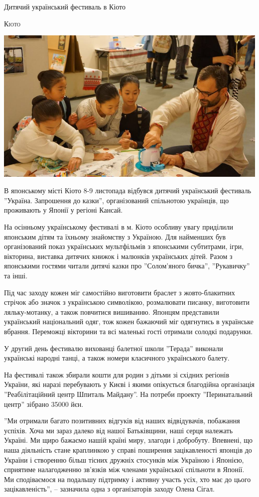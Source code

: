 \documentclass[10pt,a4paper]{article}
\newcommand{\NewsItem}[1]{%
		\usefont{T2A}{iwona}{m}{n} 
		\large #1 \vspace{4pt}
		\par \normalsize \normalfont}
\newcommand{\NewsAuthor}[1]{%
			\hfill \textsc{#1} \vspace{4pt}
			\par \normalfont}
\begin{document}
\begin{multicols}{3}
\vspace{1cm}
\NewsItem{Дитячий український фестиваль в Кіото}
\NewsAuthor{Кіото}
		\begin{center}
			\includegraphics[width=0.8\linewidth]{images/kids-fest-kioto}
		\end{center}
В японському місті Кіото 8-9 листопада відбувся дитячий український фестиваль ''Україна. Запрошення до казки'', організований спільнотою українців, що проживають у Японії у регіоні Кансай.

На осінньому українському фестивалі в м. Кіото особливу увагу приділили японським дітям та їхньому знайомству з Україною. Для найменших був організований показ українських мультфільмів з японськими субтитрами, ігри, вікторина, виставка дитячих книжок і малюнків українських дітей. Разом з японськими гостями читали дитячі казки про ''Солом'яного бичка'', ''Рукавичку'' та інші.

Під час заходу кожен міг самостійно виготовити браслет з жовто-блакитних стрічок або значок з українською символікою, розмалювати писанку, виготовити ляльку-мотанку, а також повчитися вишиванню. Японцям представили український національний одяг, тож кожен бажаючий міг одягнутись в українське вбрання. Переможці вікторини та всі маленькі гості отримали солодкі подарунки.

У другий день фестивалю вихованці балетної школи ''Терада'' виконали українські народні танці, а також номери класичного українського балету.

На фестивалі також збирали кошти для родин з дітьми зі східних регіонів України, які наразі перебувають у Києві і якими опікується благодійна організація ''Реабілітаційний центр Шпиталь Майдану''. На потреби проекту ''Перинатальний центр'' зібрано 35000 йєн.

''Ми отримали багато позитивних відгуків від наших відвідувачів, побажання успіхів. Хоча ми зараз далеко від нашої Батьківщини, наші серця належать Україні. Ми щиро бажаємо нашій країні миру, злагоди і добробуту. Впевнені, що наша діяльність стане краплинкою у справі поширення зацікавленості японців до України і створенню більш тісних дружніх стосунків між Україною і Японією, сприятиме налагодженню зв’язків між членами української спільноти в Японії. Ми сподіваємося на подальшу підтримку і активну участь усіх, хто має до цього зацікавленість'', – зазначила одна з організаторів заходу Олена Сігал.


\end{multicols}
\end{document}

